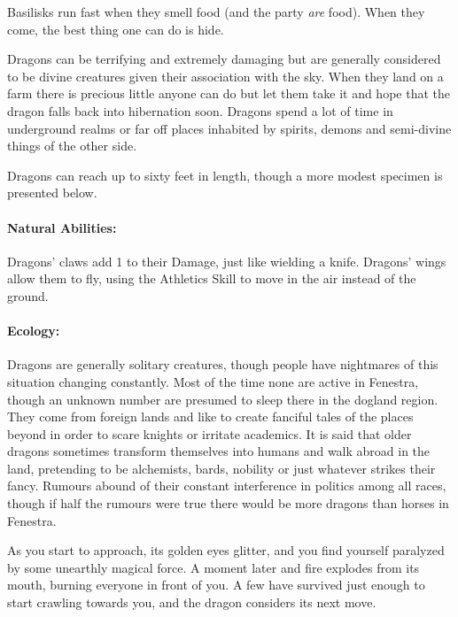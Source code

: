 \begin{multicols}{2}
	Basilisks run fast when they smell food (and the party \emph{are} food).  When they come, the best thing one can do is hide.

\label{dragon}

Dragons can be terrifying and extremely damaging but are generally considered to be divine creatures given their association with the sky.  When they land on a farm there is precious little anyone can do but let them take it and hope that the dragon falls back into hibernation soon.  Dragons spend a lot of time in underground realms or far off places inhabited by spirits, demons and semi-divine things of the other side.

	Dragons can reach up to sixty feet in length, though a more modest specimen is presented below.

	\paragraph{Natural Abilities:} Dragons' claws add 1 to their Damage, just like wielding a knife.  Dragons' wings allow them to fly, using the Athletics Skill to move in the air instead of the ground.

	\paragraph{Ecology:} Dragons are generally solitary creatures, though people have nightmares of this situation changing constantly.  Most of the time none are active in Fenestra, though an unknown number are presumed to sleep there in the dogland region.  They come from foreign lands and like to create fanciful tales of the places beyond in order to scare knights or irritate academics.  It is said that older dragons sometimes transform themselves into humans and walk abroad in the land, pretending to be alchemists, bards, nobility or just whatever strikes their fancy.  Rumours abound of their constant interference in politics among all races, though if half the rumours were true there would be more dragons than horses in Fenestra.

\begin{boxtext}

	As you start to approach, its golden eyes glitter, and you find yourself paralyzed by some unearthly magical force.
A moment later and fire explodes from its mouth, burning everyone in front of you.
A few have survived just enough to start crawling towards you, and the dragon considers its next move.


\end{boxtext}
\end{multicols}
